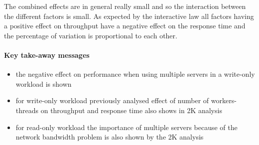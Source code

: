 \documentclass[report.tex]{subfiles}
\begin{document}
The combined effects are in general really small and so the interaction between the different factors is small.
As expected by the interactive law all factors having a positive effect on throughput have a negative effect on the response time and the percentage of variation is proportional to each other.

\paragraph{Key take-away messages}
\begin{itemize}
	\item the negative effect on performance when using multiple servers in a write-only workload is shown 
	\item for write-only workload previously analysed effect of number of workers-threads on throughput and response time also  shows in 2K analysis
	\item for read-only workload the importance of multiple servers because of the network bandwidth problem is also shown by the 2K analysis 
\end{itemize}
\end{document}
